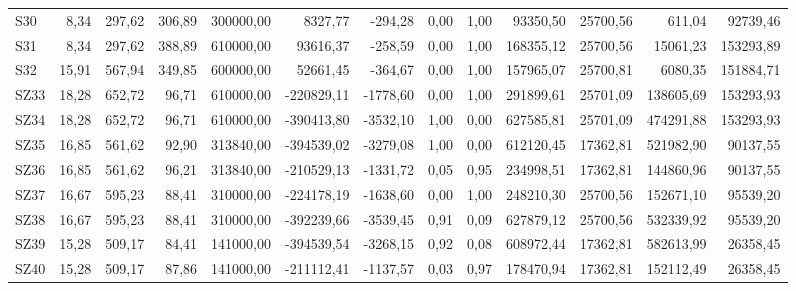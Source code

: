 \begin{longtable}{lrrrrrrrrrrrr}
S30 & 8,34 & 297,62 & 306,89 & 300000,00 & 8327,77 & -294,28 & 0,00 & 1,00 & 93350,50 & 25700,56 & 611,04 & 92739,46 \\
S31 & 8,34 & 297,62 & 388,89 & 610000,00 & 93616,37 & -258,59 & 0,00 & 1,00 & 168355,12 & 25700,56 & 15061,23 & 153293,89 \\
S32 & 15,91 & 567,94 & 349,85 & 600000,00 & 52661,45 & -364,67 & 0,00 & 1,00 & 157965,07 & 25700,81 & 6080,35 & 151884,71 \\
SZ33 & 18,28 & 652,72 & 96,71 & 610000,00 & -220829,11 & -1778,60 & 0,00 & 1,00 & 291899,61 & 25701,09 & 138605,69 & 153293,93 \\
SZ34 & 18,28 & 652,72 & 96,71 & 610000,00 & -390413,80 & -3532,10 & 1,00 & 0,00 & 627585,81 & 25701,09 & 474291,88 & 153293,93 \\
SZ35 & 16,85 & 561,62 & 92,90 & 313840,00 & -394539,02 & -3279,08 & 1,00 & 0,00 & 612120,45 & 17362,81 & 521982,90 & 90137,55 \\
SZ36 & 16,85 & 561,62 & 96,21 & 313840,00 & -210529,13 & -1331,72 & 0,05 & 0,95 & 234998,51 & 17362,81 & 144860,96 & 90137,55 \\
SZ37 & 16,67 & 595,23 & 88,41 & 310000,00 & -224178,19 & -1638,60 & 0,00 & 1,00 & 248210,30 & 25700,56 & 152671,10 & 95539,20 \\
SZ38 & 16,67 & 595,23 & 88,41 & 310000,00 & -392239,66 & -3539,45 & 0,91 & 0,09 & 627879,12 & 25700,56 & 532339,92 & 95539,20 \\
SZ39 & 15,28 & 509,17 & 84,41 & 141000,00 & -394539,54 & -3268,15 & 0,92 & 0,08 & 608972,44 & 17362,81 & 582613,99 & 26358,45 \\
SZ40 & 15,28 & 509,17 & 87,86 & 141000,00 & -211112,41 & -1137,57 & 0,03 & 0,97 & 178470,94 & 17362,81 & 152112,49 & 26358,45 \\
\hline
\end{longtable}
